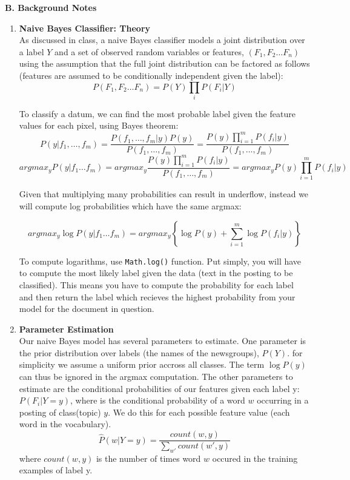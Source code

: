 \documentclass[11pt,a4paper]{article}
\begin{document}
\textbf{B. Background Notes}
\begin{enumerate}
\item{\textbf{Naive Bayes Classifier: Theory}}\\
As discussed in class, a naive Bayes classifier models a joint distribution over a label $Y$ and a set of observed random variables or features, $( F_1 , F_2 \dots F_n)$  using the assumption that the full joint distribution can be factored as follows (features are assumed to be conditionally independent given the label): 
\[P ( F_1 , F_2 \dots F_n) = P(Y) \prod_i P(F_i | Y)\]

\newpage

To classify a datum, we can find the most probable label given the feature values for each pixel, using Bayes theorem:
\[ P(y|f_1 , \dots , f_m ) =  \frac{P( f_1 , \dots , f_m  | y) P (y)	}{ P( f_1 , \dots , f_m  )} = \frac{P (y) \prod_{i=1}^{m} P( f_i | y) 	}{ P( f_1 , \dots , f_m  )} \]
\[arg max_{y} P(y| f_1 \dots f_m) = arg max_{y} \frac{P (y) \prod_{i=1}^{m} P( f_i | y) 	}{ P( f_1 , \dots , f_m  )} = arg max_{y} P (y) \prod_{i=1}^{m} P( f_i | y) 	\]

Given that multiplying many probabilities can result in underflow, instead we will compute log probabilities which have the same argmax:

\[ arg max_{y} \log P(y| f_1 \dots f_m) =  arg max_{y} \left\{ \log P (y) + \sum_{i=1}^{m} \log P( f_i | y)  \right\}\]

To compute logarithms, use \texttt{Math.log()} function. Put simply, you will have to compute the most likely label given the data (text in the posting to be classified). This means you have to compute the probability for each label  and then  return the label which recieves the highest probability from your model for the document in question.\\

\item{\textbf{Parameter Estimation}}\\
Our naive Bayes model has several parameters to estimate. One parameter is the prior distribution over labels (the names of the newsgroups), $P(Y)$. for simplicity we assume a uniform prior accross all classes. The term $ \log P (y)$ can thus be ignored in the argmax computation. The other parameters to estimate are the conditional probabilities of our features given each label y: $P(F_i |Y=y)$, where   is the conditional probability of a word $w$ occurring in a posting of class(topic) $y$. We do this for each possible feature value (each word in the vocabulary).
\[ \hat{P}(w | Y = y) = \frac{count(w , y)}{\sum_{w'}{count(w',y)}}\]
where $count(w , y)$ is the number of times word $w$ occured in the training examples of label y.\\


\end{enumerate}
\end{document}

